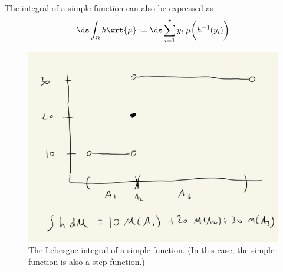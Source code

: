 \documentclass{article} %
\begin{document}
The integral of a simple function can also be expressed as 
\[\ds\int_{\Omega} h \wrt{\mu} := \ds\sum_{i=1}^r y_i \; \mu \bigg( h^{-1}(y_i) \bigg) \]

\begin{figure}[H]
\centering 
\includegraphics[width=.5\textwidth]{images/integral_of_simple_function}	
\caption{The Lebesgue integral of a simple function. {\scriptsize (In this case, the simple function is also a step function.)}}
\end{figure}
\end{document}
